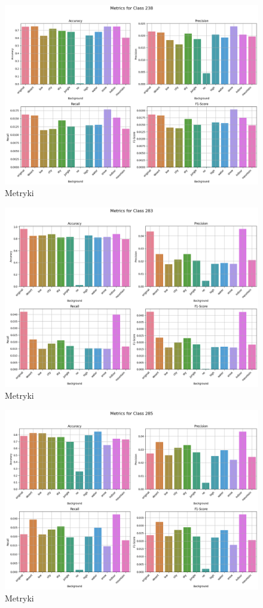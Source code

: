 \begin{figure}
	\centering\includegraphics[width=.9\textwidth]{img/238}
	\caption{Metryki}
	\label{rys:238}
\end{figure}

\begin{figure}
	\centering\includegraphics[width=.9\textwidth]{img/283}
	\caption{Metryki}
	\label{rys:283}
\end{figure}

\begin{figure}
	\centering\includegraphics[width=.9\textwidth]{img/285}
	\caption{Metryki}
	\label{rys:285}
\end{figure}

